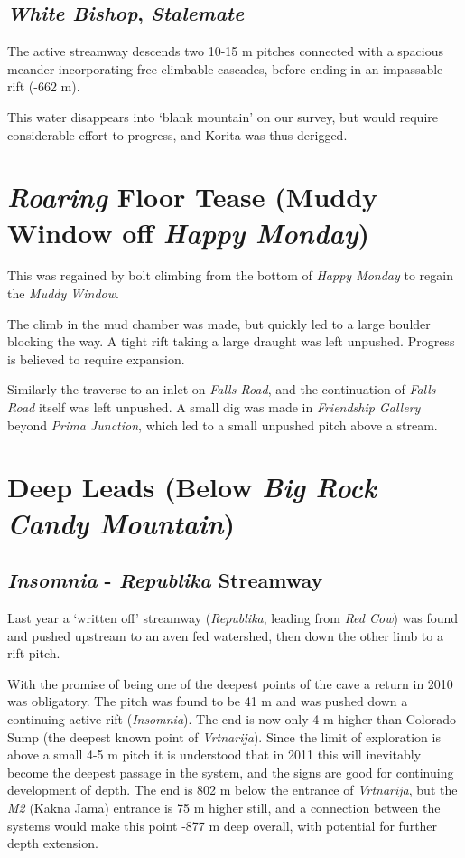 \subsection{\texorpdfstring{\emph{White Bishop},
\emph{Stalemate}}{White Bishop, Stalemate}}

The active streamway descends two 10-15 m pitches connected with a
spacious meander incorporating free climbable cascades, before ending in
an impassable rift (-662 m).

This water disappears into `blank mountain' on our survey, but would
require considerable effort to progress, and Korita was thus derigged.


\section{\texorpdfstring{\emph{Roaring} Floor Tease (\textbf{Muddy
Window} off \emph{Happy
Monday})}{Roaring Floor Tease (Muddy Window off Happy Monday)}}

This was regained by bolt climbing from the bottom of \emph{Happy
Monday} to regain the \emph{Muddy Window}.

The climb in the mud chamber was made, but quickly led to a large
boulder blocking the way. A tight rift taking a large draught was left
unpushed. Progress is believed to require expansion.

Similarly the traverse to an inlet on \emph{Falls Road}, and the
continuation of \emph{Falls Road} itself was left unpushed. A small dig
was made in \emph{Friendship Gallery} beyond \emph{Prima Junction},
which led to a small unpushed pitch above a stream.


\section{\texorpdfstring{Deep Leads (Below \emph{Big Rock Candy
Mountain})}{Deep Leads (Below Big Rock Candy Mountain)}}


\subsection{\texorpdfstring{\emph{Insomnia} - \emph{Republika}
Streamway}{Insomnia - Republika Streamway}}

Last year a `written off' streamway (\emph{Republika}, leading from
\emph{Red Cow}) was found and pushed upstream to an aven fed watershed,
then down the other limb to a rift pitch.

With the promise of being one of the deepest points of the cave a return
in 2010 was obligatory. The pitch was found to be 41 m and was pushed
down a continuing active rift (\emph{Insomnia}). The end is now only 4 m
higher than Colorado Sump (the deepest known point of \emph{Vrtnarija}).
Since the limit of exploration is above a small 4-5 m pitch it is
understood that in 2011 this will inevitably become the deepest passage
in the system, and the signs are good for continuing development of
depth. The end is 802 m below the entrance of \emph{Vrtnarija}, but the
\emph{M2} (Kakna Jama) entrance is 75 m higher still, and a connection
between the systems would make this point -877 m deep overall, with
potential for further depth extension.

